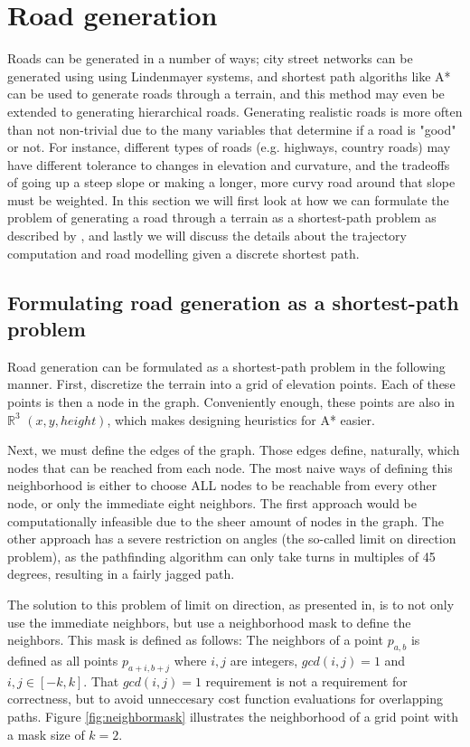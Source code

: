 \section{Road generation}
Roads can be generated in a number of ways; city street networks can be generated using using Lindenmayer systems\cite{citymodelling}, and shortest path algoriths like A* can be used to generate roads through a terrain, and this method may even be extended to generating hierarchical roads.\cite{roadgen}\cite{roadgen2}
Generating realistic roads is more often than not non-trivial due to the many variables that determine if a road is "good" or not. For instance, different types of roads (e.g. highways, country roads) may have different tolerance to changes in elevation and curvature, and the tradeoffs of going up a steep slope or making a longer, more curvy road around that slope must be weighted. In this section we will first look at how we can formulate the problem of generating a road through a terrain as a shortest-path problem as described by \cite{roadgen}, and lastly we will discuss the details about the trajectory computation and road modelling given a discrete shortest path.

\subsection{Formulating road generation as a shortest-path problem}
\label{sec:roadgen_shortestpath}
Road generation can be formulated as a shortest-path problem in the following manner. First, discretize the terrain into a grid of elevation points. Each of these points is then a node in the graph. Conveniently enough, these points are also in $\mathbb{R}^3$ $(x,y,height)$, which makes designing heuristics for A* easier.

Next, we must define the edges of the graph. Those edges define, naturally, which nodes that can be reached from each node. The most naive ways of defining this neighborhood is either to choose ALL nodes to be reachable from every other node, or only the immediate eight neighbors. The first approach would be computationally infeasible due to the sheer amount of nodes in the graph. The other approach has a severe restriction on angles (the so-called limit on direction problem\cite{roadgen}), as the pathfinding algorithm can only take turns in multiples of 45 degrees, resulting in a fairly jagged path. 

The solution to this problem of limit on direction, as presented in\cite{roadgen}, is to not only use the immediate neighbors, but use a neighborhood mask to define the neighbors. This mask is defined as follows: The neighbors of a point $p_{a,b}$ is defined as all points $p_{a+i,b+j}$ where $i,j$ are integers, $gcd(i,j) = 1$ and $i,j \in [-k,k]$. That $gcd(i,j)=1$ requirement is not a requirement for correctness, but to avoid unneccesary cost function evaluations for overlapping paths. Figure \ref{fig:neighbormask} illustrates the neighborhood of a grid point with a mask size of $k=2$.


